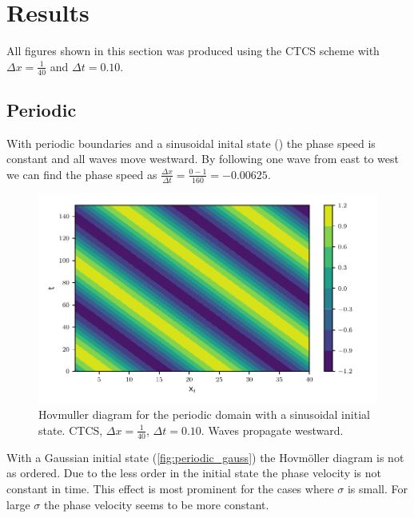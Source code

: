 \newpage
\section{Results}


All figures shown in this section was produced using the CTCS scheme with
$\Delta x = \frac{1}{40} $ and $\Delta t = 0.10$.

\subsection{Periodic}

With periodic boundaries and a sinusoidal inital state ()
the phase speed is constant and all waves move westward. By following one wave
from east to west we can find the phase speed as $\frac{\Delta x}{\Delta t} =
\frac{0-1}{160} = -0.00625$.

\begin{figure}[htp]
  \centering
  \includegraphics[width=\textwidth]{../figures/psi_periodic_centered_short.pdf}
  \caption{Hovmuller diagram for the periodic domain with a sinusoidal initial state. CTCS, $\Delta x = \frac{1}{40}$, $\Delta t = 0.10$. Waves propagate westward.}
  \label{fig:periodic_sine}
\end{figure}

With a Gaussian initial state (\cref{fig:periodic_gauss}) the Hovmöller diagram
is not as ordered. Due to the less order in the initial state the phase velocity
is not constant in time. This effect is most prominent for the cases where
$\sigma$ is small. For large $\sigma$ the phase velocity seems to be more
constant.


